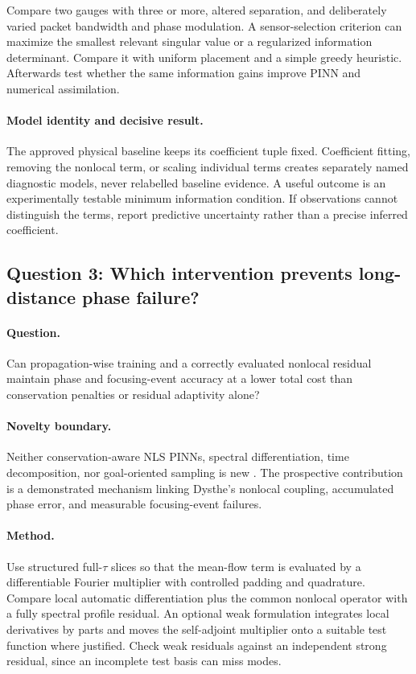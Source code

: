Compare two gauges with three or more, altered separation, and deliberately
varied packet bandwidth and phase modulation. A sensor-selection criterion
can maximize the smallest relevant singular value or a regularized
information determinant. Compare it with uniform placement and a simple
greedy heuristic. Afterwards test whether the same information gains
improve PINN and numerical assimilation.

\paragraph{Model identity and decisive result.}
The approved physical baseline keeps its coefficient tuple fixed.
Coefficient fitting, removing the nonlocal term, or scaling individual
terms creates separately named diagnostic models, never relabelled
baseline evidence. A useful outcome is an experimentally testable minimum
information condition. If observations cannot distinguish the terms,
report predictive uncertainty rather than a precise inferred coefficient.

\subsection{Question 3: Which intervention prevents long-distance phase failure?}
\paragraph{Question.}
Can propagation-wise training and a correctly evaluated nonlocal residual
maintain phase and focusing-event accuracy at a lower total cost than
conservation penalties or residual adaptivity alone?

\paragraph{Novelty boundary.}
Neither conservation-aware NLS PINNs, spectral differentiation, time
decomposition, nor goal-oriented sampling is new
\cite{noether,cpa,tdd,spectral,goal}. The prospective contribution is a
demonstrated mechanism linking Dysthe's nonlocal coupling, accumulated
phase error, and measurable focusing-event failures.

\paragraph{Method.}
Use structured full-$\tau$ slices so that the mean-flow term is evaluated
by a differentiable Fourier multiplier with controlled padding and
quadrature. Compare local automatic differentiation plus the common
nonlocal operator with a fully spectral profile residual. An optional
weak formulation integrates local derivatives by parts and moves the
self-adjoint multiplier onto a suitable test function where justified.
Check weak residuals against an independent strong residual, since an
incomplete test basis can miss modes.

